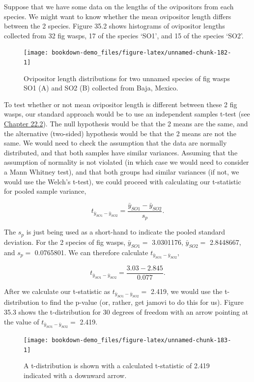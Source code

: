 \documentclass[
]{scrbook}
\begin{document}
Suppose that we have some data on the lengths of the ovipositors from each species.
We might want to know whether the mean ovipositor length differs between the 2 species. Figure 35.2 shows histograms of ovipositor lengths collected from 32 fig wasps, 17 of the species `SO1', and 15 of the species `SO2'.

\begin{figure}
\texttt{[image: bookdown-demo\_files/figure-latex/unnamed-chunk-182-1]} \caption{Ovipositor length distributions for two unnamed species of fig wasps SO1 (A) and SO2 (B) collected from Baja, Mexico.}\label{fig:unnamed-chunk-182}
\end{figure}

To test whether or not mean ovipositor length is different between these 2 fig wasps, our standard approach would be to use an independent samples t-test (see \protect\hyperlink{independent-samples-t-test}{Chapter 22.2}).
The null hypothesis would be that the 2 means are the same, and the alternative (two-sided) hypothesis would be that the 2 means are not the same.
We would need to check the assumption that the data are normally distributed, and that both samples have similar variances.
Assuming that the assumption of normality is not violated (in which case we would need to consider a Mann Whitney test), and that both groups had similar variances (if not, we would use the Welch's t-test), we could proceed with calculating our t-statistic for pooled sample variance,

\[t_{\bar{y}_{SO1} - \bar{y}_{SO2}} = \frac{\bar{y}_{SO1} - \bar{y}_{SO2}}{s_{p}}.\]

The \(s_{p}\) is just being used as a short-hand to indicate the pooled standard deviation.
For the 2 species of fig wasps, \(\bar{y}_{SO1} =\) 3.0301176, \(\bar{y}_{SO2} =\) 2.8448667, and \(s_{p} =\) 0.0765801.
We can therefore calculate \(t_{\bar{y}_{SO1} - \bar{y}_{SO2}}\),

\[t_{\bar{y}_{SO1} - \bar{y}_{SO2}} = \frac{3.03 - 2.845}{0.077}.\]

After we calculate our t-statistic as \(t_{\bar{y}_{SO1} - \bar{y}_{SO2}} =\) 2.419, we would use the t-distribution to find the p-value (or, rather, get jamovi to do this for us).
Figure 35.3 shows the t-distribution for 30 degrees of freedom with an arrow pointing at the value of \(t_{\bar{y}_{SO1} - \bar{y}_{SO2}} =\) 2.419.

\begin{figure}
\texttt{[image: bookdown-demo\_files/figure-latex/unnamed-chunk-183-1]} \caption{A t-distribution is shown with a calculated t-statistic of 2.419 indicated with a downward arrow.}\label{fig:unnamed-chunk-183}
\end{figure}
\end{document}
